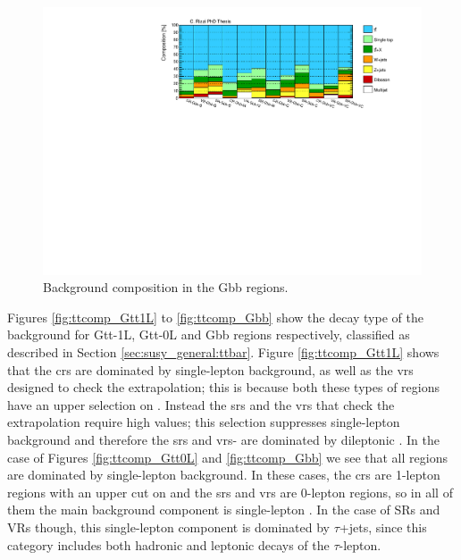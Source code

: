 \begin{figure}[htbp]
\includegraphics[width=\textwidth]{figures/Chap8/Rizzi-Fig8-12.pdf}
\caption{Background composition in the Gbb regions.}
	\label{fig:bkgcomp_Gbb}
\end{figure}


Figures \ref{fig:ttcomp_Gtt1L} to \ref{fig:ttcomp_Gbb} show the decay type of the \ttbar background for  Gtt-1L, Gtt-0L and Gbb regions respectively, classified as described in Section \ref{sec:susy_general:ttbar}.
Figure \ref{fig:ttcomp_Gtt1L} shows that the \glspl{cr} are dominated by single-lepton \ttbar background, as well as the \glspl{vr} designed to check the \mtb extrapolation;
this is because both these types of regions have an upper selection on \mt.
Instead the \glspl{sr} and the \glspl{vr} that check the \mt extrapolation require high \mt values;
this selection suppresses single-lepton \ttbar background and therefore the \glspl{sr} and \glspl{vr}-\mt
are dominated by dileptonic \ttbar.
In the case of Figures \ref{fig:ttcomp_Gtt0L} and \ref{fig:ttcomp_Gbb} we see that all regions are dominated by single-lepton \ttbar background.
In these cases, the \glspl{cr} are 1-lepton regions with an upper cut on \mt and the \glspl{sr} and \glspl{vr} are 0-lepton regions,
so in all of them the main background component is  single-lepton \ttbar. In the case of SRs and VRs though, this single-lepton component
is dominated by $\tau$+jets, since this category includes both hadronic and leptonic decays of the $\tau$-lepton.


